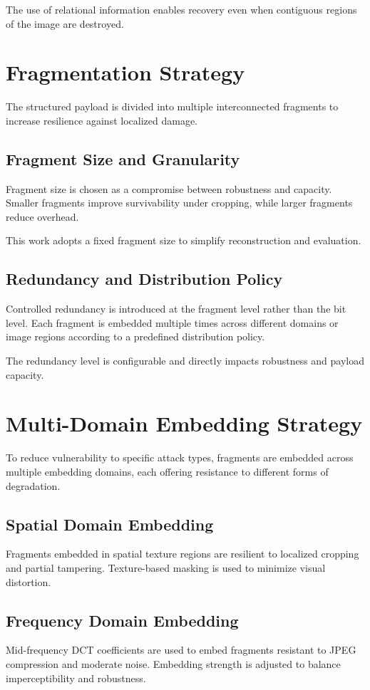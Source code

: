 \documentclass[12pt,a4paper,oneside]{report}
\begin{document}
	The use of relational information enables recovery even when contiguous regions of the image are destroyed.
	
	\section{Fragmentation Strategy}
	The structured payload is divided into multiple interconnected fragments to increase resilience against localized damage.
	
	\subsection{Fragment Size and Granularity}
	Fragment size is chosen as a compromise between robustness and capacity. Smaller fragments improve survivability under cropping, while larger fragments reduce overhead.
	
	This work adopts a fixed fragment size to simplify reconstruction and evaluation.
	
	\subsection{Redundancy and Distribution Policy}
	Controlled redundancy is introduced at the fragment level rather than the bit level. Each fragment is embedded multiple times across different domains or image regions according to a predefined distribution policy.
	
	The redundancy level is configurable and directly impacts robustness and payload capacity.
	
	\section{Multi-Domain Embedding Strategy}
	To reduce vulnerability to specific attack types, fragments are embedded across multiple embedding domains, each offering resistance to different forms of degradation.
	
	\subsection{Spatial Domain Embedding}
	Fragments embedded in spatial texture regions are resilient to localized cropping and partial tampering. Texture-based masking is used to minimize visual distortion.
	
	\subsection{Frequency Domain Embedding}
	Mid-frequency DCT coefficients are used to embed fragments resistant to JPEG compression and moderate noise. Embedding strength is adjusted to balance imperceptibility and robustness.
	
\end{document}
